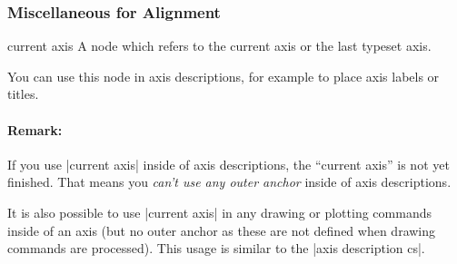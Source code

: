 \subsubsection{Miscellaneous for Alignment}

\begin{predefinednode}{current axis}
	A node which refers to the current axis or the last typeset axis.

	You can use this node in axis descriptions, for example to place axis labels or titles.

	\paragraph{Remark:} If you use |current axis| inside of axis descriptions, the ``current axis'' is not yet finished. That means you \emph{can't use any outer anchor} inside of axis descriptions.

	It is also possible to use |current axis| in any drawing or plotting commands inside of an axis (but no outer anchor as these are not defined when drawing commands are processed). This usage is similar to the |axis description cs|.
\end{predefinednode}

